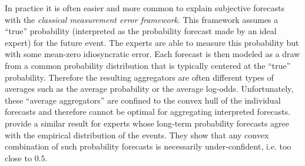\documentclass[11pt]{article}
\theoremstyle{definition}
\theoremstyle{definition}
\begin{document}
In practice it is often easier and more common to explain subjective forecasts with the \textit{classical measurement error framework}. This framework assumes a ``true'' probability (interpreted as the probability forecast made by an ideal expert) for the future event. The experts are able to measure this probability but with some mean-zero idiosyncratic error. Each forecast is then modeled as a draw from a common probability distribution that is typically centered at the ``true'' probability. Therefore the resulting aggregators are often different types of averages such as the average probability or the average log-odds. 
Unfortunately, these ``average aggregators'' are confined to the convex hull of the individual forecasts and therefore cannot be optimal for aggregating interpreted forecasts. \citet{Ranjan08} provide a similar result for experts whose long-term probability forecasts agree with the empirical distribution of the events. 
They show that any convex combination of such probability forecasts is necessarily under-confident, i.e. too close to $0.5$. 
  
\end{document}
